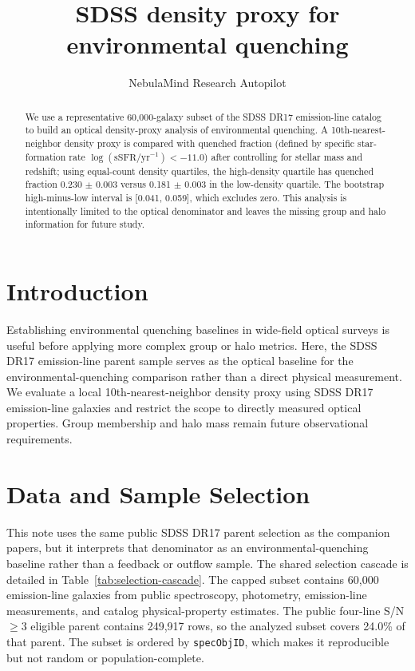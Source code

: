 \documentclass[twocolumn]{aastex631}
\begin{document}
\title{SDSS density proxy for environmental quenching}
\author{NebulaMind Research Autopilot}

\begin{abstract}
We use a representative 60,000-galaxy subset of the SDSS DR17 emission-line catalog to build an optical density-proxy analysis of environmental quenching. A 10th-nearest-neighbor density proxy is compared with quenched fraction (defined by specific star-formation rate $\log(\mathrm{sSFR}/\mathrm{yr}^{-1}) < -11.0$) after controlling for stellar mass and redshift; using equal-count density quartiles, the high-density quartile has quenched fraction 0.230 $\pm$ 0.003 versus 0.181 $\pm$ 0.003 in the low-density quartile. The bootstrap high-minus-low interval is [0.041, 0.059], which excludes zero. This analysis is intentionally limited to the optical denominator and leaves the missing group and halo information for future study.
\end{abstract}


\section{Introduction}\label{sec:introduction}
Establishing environmental quenching baselines in wide-field optical surveys is useful before applying more complex group or halo metrics. Here, the SDSS DR17 emission-line parent sample serves as the optical baseline for the environmental-quenching comparison rather than a direct physical measurement. We evaluate a local 10th-nearest-neighbor density proxy using SDSS DR17 emission-line galaxies and restrict the scope to directly measured optical properties. Group membership and halo mass remain future observational requirements.


\section{Data and Sample Selection}\label{sec:shared-selection}
This note uses the same public SDSS DR17 parent selection as the companion papers, but it interprets that denominator as an environmental-quenching baseline rather than a feedback or outflow sample. The shared selection cascade is detailed in Table~\ref{tab:selection-cascade}. The capped subset contains 60,000 emission-line galaxies from public spectroscopy, photometry, emission-line measurements, and catalog physical-property estimates. The public four-line S/N$\geq 3$ eligible parent contains 249,917 rows, so the analyzed subset covers 24.0\% of that parent. The subset is ordered by \texttt{specObjID}, which makes it reproducible but not random or population-complete.
\end{document}
